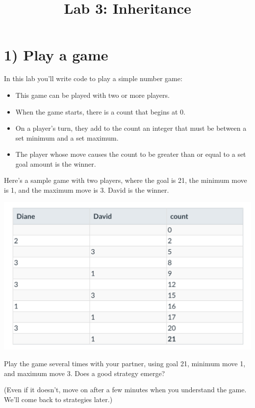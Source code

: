 \documentclass[12pt]{article}
\begin{document}
\title{Lab 3: Inheritance}
\date{}
\maketitle

\section*{1) Play a game}

In this lab you’ll write code to play a simple number game:

\begin{itemize}
    \item This game can be played with two or more players.
    \item When the game starts, there is a count that begins at 0.
    \item On a player’s turn, they add to the count an integer that must be between a set minimum and a set maximum.
    \item The player whose move causes the count to be greater than or equal to a set goal amount is the winner.
\end{itemize}

\bigskip

\noindent Here’s a sample game with two players, where the goal is 21, the minimum move is 1, and the maximum move is 3. David is the winner.

\begin{center}
\includegraphics[width=0.8\linewidth]{../images/lab_3/table.png}
\end{center}

\bigskip

\noindent Play the game several times with your partner, using goal 21, minimum move 1,
and maximum move 3. Does a good strategy emerge?

\bigskip

\noindent (Even if it doesn’t, move on after a few minutes when you understand the game.
We’ll come back to strategies later.)
\end{document}
